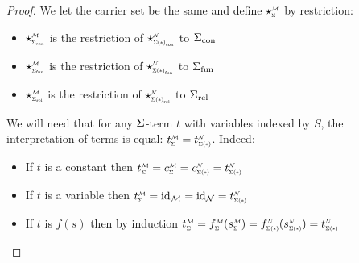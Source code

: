 \begin{proof}
    We let the carrier set be the same and 
    define $\intp{\Si}{\MM}$ by restriction:
    \begin{itemize}
        \item $\intp{\const{\Si}}{\MM}$ is
        the restriction of $\intp{\const{\Si(*)}}{\NN}$ to ${\Sigma}_\mathrm{con}$
        \item $\intp{\func{\Si}}{\MM}$ is
        the restriction of $\intp{\func{\Si(*)}}{\NN}$ to ${\Sigma}_\mathrm{fun}$
        \item $\intp{\rel{\Si}}{\MM}$ is
        the restriction of $\intp{\rel{\Si(*)}}{\NN}$ to ${\Sigma}_\mathrm{rel}$
    \end{itemize}
    We will need that for any $\Sigma$-term $t$ with variables indexed by $S$,
    the  interpretation of terms is equal:
    $\subintp{\Si}{\MM}{t} = \subintp{\Si(*)}{\NN}{t}$.
    Indeed:
    \begin{itemize}
        \item If $t$ is a constant then 
        $\subintp{\Si}{\MM}{t} = \subintp{\Si}{\MM}{c} =
        \subintp{\Si(*)}{\NN}{c} = \subintp{\Si(*)}{\NN}{t}$
        \item If $t$ is a variable then 
        $\subintp{\Si}{\MM}{t} = \id{{\MM}} =
        \id{{\NN}} = \subintp{\Si(*)}{\NN}{t}$
        \item If $t$ is $f(s)$ then by induction
        $\subintp{\Si}{\MM}{t} = \subintp{\Si}{\MM}{f}(\subintp{\Si}{\MM}{s}) =
        \subintp{\Si(*)}{\NN}{f}(\subintp{\Si(*)}{\NN}{s}) = 
        \subintp{\Si(*)}{\NN}{t}$
    \end{itemize}
    

\end{proof}
